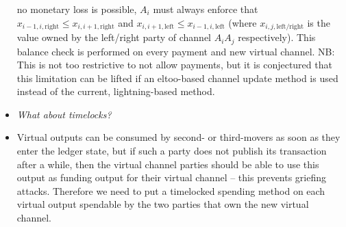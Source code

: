 \begin{itemize}
  no monetary loss is possible, $A_i$ must always enforce that $x_{i-1, i,
  \mathrm{right}} \leq x_{i, i+1, \mathrm{right}}$ and $x_{i, i+1,
  \mathrm{left}} \leq x_{i-1, i, \mathrm{left}}$ (where $x_{i, j,
  \mathrm{left/right}}$ is the value owned by the left/right party of channel
  $A_i A_j$ respectively). This balance check is performed on every payment and
  new virtual channel. NB: This is not too restrictive to not allow payments,
  but it is conjectured that this limitation can be lifted if an eltoo-based
  channel update method is used instead of the current, lightning-based method.
  \item \emph{What about timelocks?}
  \item Virtual outputs can be consumed by second- or third-movers as
  soon as they enter the ledger state, but if such a party does not publish its
  transaction after a while, then the virtual channel parties should be able to
  use this output as funding output for their virtual channel -- this prevents
  griefing attacks. Therefore we need to put a timelocked spending method on
  each virtual output spendable by the two parties that own the new virtual
  channel.


\end{itemize}
